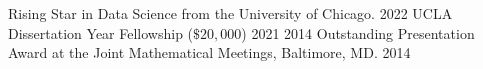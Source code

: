 


\begin{cvhonors}

  \cvhonor
    {{Rising Star in Data Science from the University of Chicago.} \href{https://datascience.uchicago.edu/rising-stars/\#rising-stars-profiles-2/}{ }} %
    {2022} %
  \cvhonor
    {UCLA Dissertation Year Fellowship ($\$ 20,000$)} %
    {2021} %
  \cvhonor
    {2014 Outstanding Presentation Award at the Joint Mathematical Meetings, Baltimore, MD.} %
    {2014} %
\end{cvhonors}